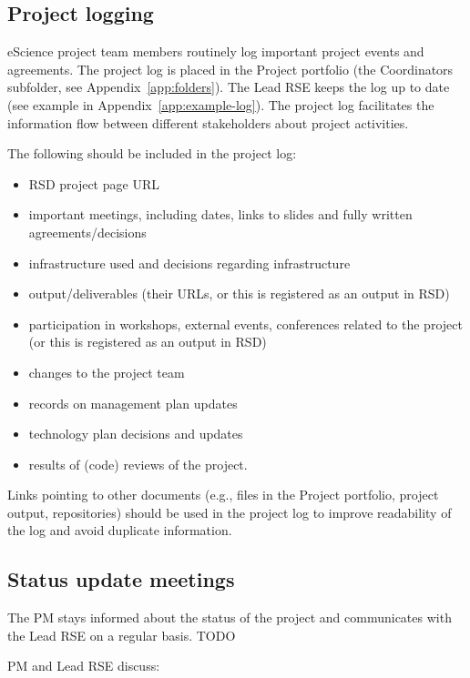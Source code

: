 \documentclass[11pt]{article}
\begin{document}
\subsection{Project logging}
\label{sec:exec:log}
eScience project team members routinely log important project events and agreements. The project log is placed in the
Project portfolio (the Coordinators subfolder, see Appendix~\ref{app:folders}). The Lead RSE keeps the log up to
date (see example in Appendix~\ref{app:example-log}). The project log facilitates the information flow between
different stakeholders about project activities.

The following should be included in the project log:
\begin{itemize}
\item RSD project page URL
\item important meetings, including dates, links to slides and fully written agreements/decisions
\item infrastructure used and decisions regarding infrastructure
\item output/deliverables (their URLs, or this is registered as an output in RSD)
\item participation in workshops, external events, conferences related to the project (or this is registered as an output in
RSD)
\item changes to the project team
\item records on management plan updates
\item technology plan decisions and updates
\item results of (code) reviews of the project.
\end{itemize}

Links pointing to other documents (e.g., files in the Project portfolio, project output, repositories) should be used in
the project log to improve readability of the log and avoid duplicate information.

\subsection{Status update meetings}
\label{sec:exec:status}
The PM stays informed about the status of the project and communicates with the Lead RSE on a regular basis.
TODO

PM and Lead RSE discuss:
\end{document}
